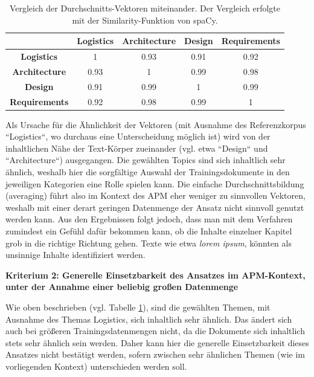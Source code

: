 \begin{table}[h]
\centering
\begin{tabular}{|c|c|c|c|c|}
\hline
                      & \textbf{Logistics} & \textbf{Architecture} & \textbf{Design} & \textbf{Requirements} \\ \hline
\textbf{Logistics}    & 1                  & 0.93                  & 0.91            & 0.92                  \\ \hline
\textbf{Architecture} & 0.93               & 1                     & 0.99            & 0.98                  \\ \hline
\textbf{Design}       & 0.91               & 0.99                  & 1               & 0.99                  \\ \hline
\textbf{Requirements} & 0.92               & 0.98                  & 0.99            & 1                     \\ \hline
\end{tabular}
\caption{Vergleich der Durchschnitts-Vektoren miteinander. Der Vergleich erfolgte mit der Similarity-Funktion von spaCy.}
\label{table:4}
\end{table}

Als Ursache für die Ähnlichkeit der Vektoren (mit Ausnahme des Referenzkorpus ``Logistics``, wo durchaus eine Unterscheidung möglich ist) wird von der inhaltlichen Nähe der Text-Körper zueinander (vgl. etwa ``Design`` und ``Architecture``) ausgegangen. Die gewählten Topics sind sich inhaltlich sehr ähnlich, weshalb hier die sorgfältige Auswahl der Trainingsdokumente in den jeweiligen Kategorien eine Rolle spielen kann. Die einfache Durchschnittsbildung (averaging) führt also im Kontext des APM eher weniger zu sinnvollen Vektoren, weshalb mit einer derart geringen Datenmenge der Ansatz nicht sinnvoll genutzt werden kann.
Aus den Ergebnissen folgt jedoch, dass man mit dem Verfahren zumindest ein Gefühl dafür bekommen kann, ob die Inhalte einzelner Kapitel grob in die richtige Richtung gehen. Texte wie etwa {\textit{lorem ipsum}}, könnten als unsinnige Inhalte identifiziert werden.

{\bf Kriterium 2: Generelle Einsetzbarkeit des Ansatzes im APM-Kontext, unter der Annahme einer beliebig großen Datenmenge}

Wie oben beschrieben (vgl. Tabelle \ref{table:4}), sind die gewählten Themen, mit Ausnahme des Themas Logistics, sich inhaltlich sehr ähnlich. Das ändert sich auch bei größeren Trainingsdatenmengen nicht, da die Dokumente sich inhaltlich stets sehr ähnlich sein werden. Daher kann hier die generelle Einsetzbarkeit dieses Ansatzes nicht bestätigt werden, sofern zwischen sehr ähnlichen Themen (wie im vorliegenden Kontext) unterschieden werden soll.

